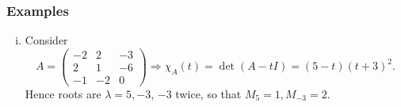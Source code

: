 \documentclass[10pt]{article}
\begin{document}
    \subsubsection{Examples}
    \begin{example}
        \begin{enumerate}[(i)]
            \item Consider 
            \[
                A=\begin{pmatrix}
                    -2 & 2 & -3 \\
                    2 & 1 & -6 \\
                    -1 & -2 & 0
                \end{pmatrix}\Longrightarrow \chi_A(t)=\det (A-tI)=(5-t)(t+3)^2
            .\]
            Hence roots are $ \lambda=5,-3 $, $-3$ twice, so that $ M_5=1, M_{-3}=2 $.
            

\end{enumerate}
\end{example}
\end{document}

